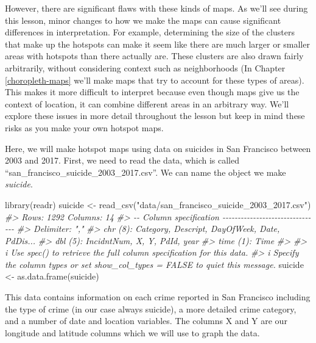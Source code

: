 \documentclass[
]{krantz}
\makeatletter
\newenvironment{Shaded}{\begin{snugshade}}{\end{snugshade}}
\newcommand{\CommentTok}[1]{\textcolor[rgb]{0.37,0.37,0.37}{\textit{#1}}}
\newcommand{\FunctionTok}[1]{\textcolor[rgb]{0,0,0}{#1}}
\newcommand{\NormalTok}[1]{#1}
\newcommand{\OtherTok}[1]{\textcolor[rgb]{0.37,0.37,0.37}{#1}}
\newcommand{\StringTok}[1]{\textcolor[rgb]{0.5,0.5,0.5}{#1}}
\newenvironment{kframe}{%
\medskip{}
\setlength{\fboxsep}{.8em}
 \def\at@end@of@kframe{}%
 \ifinner\ifhmode%
  \def\at@end@of@kframe{\end{minipage}}%
  \begin{minipage}{\columnwidth}%
 \fi\fi%
 \def\FrameCommand##1{\hskip\@totalleftmargin \hskip-\fboxsep
 \colorbox{shadecolor}{##1}\hskip-\fboxsep
     \hskip-\linewidth \hskip-\@totalleftmargin \hskip\columnwidth}%
 \MakeFramed {\advance\hsize-\width
   \@totalleftmargin\z@ \linewidth\hsize
   \@setminipage}}%
 {\par\unskip\endMakeFramed%
 \at@end@of@kframe}
\renewenvironment{Shaded}{\begin{kframe}}{\end{kframe}}
\makeatother
\begin{document}
However, there are significant flaws with these kinds of maps. As we'll see during this lesson, minor changes to how we make the maps can cause significant differences in interpretation. For example, determining the size of the clusters that make up the hotspots can make it seem like there are much larger or smaller areas with hotspots than there actually are. These clusters are also drawn fairly arbitrarily, without considering context such as neighborhoods (In Chapter \ref{choropleth-maps} we'll make maps that try to account for these types of areas). This makes it more difficult to interpret because even though maps give us the context of location, it can combine different areas in an arbitrary way. We'll explore these issues in more detail throughout the lesson but keep in mind these risks as you make your own hotspot maps.

Here, we will make hotspot maps using data on suicides in San Francisco between 2003 and 2017. First, we need to read the data, which is called ``san\_francisco\_suicide\_2003\_2017.csv''. We can name the object we make \emph{suicide}.

\begin{Shaded}
\begin{Highlighting}[]
\FunctionTok{library}\NormalTok{(readr)}
\NormalTok{suicide }\OtherTok{\textless{}{-}} \FunctionTok{read\_csv}\NormalTok{(}\StringTok{"data/san\_francisco\_suicide\_2003\_2017.csv"}\NormalTok{)}
\CommentTok{\#\textgreater{} Rows: 1292 Columns: 14}
\CommentTok{\#\textgreater{} {-}{-} Column specification {-}{-}{-}{-}{-}{-}{-}{-}{-}{-}{-}{-}{-}{-}{-}{-}{-}{-}{-}{-}{-}{-}{-}{-}{-}{-}{-}{-}{-}{-}{-}{-}}
\CommentTok{\#\textgreater{} Delimiter: ","}
\CommentTok{\#\textgreater{} chr  (8): Category, Descript, DayOfWeek, Date, PdDis...}
\CommentTok{\#\textgreater{} dbl  (5): IncidntNum, X, Y, PdId, year}
\CommentTok{\#\textgreater{} time (1): Time}
\CommentTok{\#\textgreater{} }
\CommentTok{\#\textgreater{} i Use \textasciigrave{}spec()\textasciigrave{} to retrieve the full column specification for this data.}
\CommentTok{\#\textgreater{} i Specify the column types or set \textasciigrave{}show\_col\_types = FALSE\textasciigrave{} to quiet this message.}
\NormalTok{suicide }\OtherTok{\textless{}{-}} \FunctionTok{as.data.frame}\NormalTok{(suicide)}
\end{Highlighting}
\end{Shaded}

This data contains information on each crime reported in San Francisco including the type of crime (in our case always suicide), a more detailed crime category, and a number of date and location variables. The columns X and Y are our longitude and latitude columns which we will use to graph the data.
\end{document}
